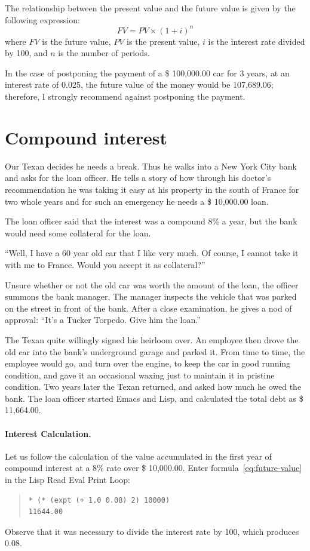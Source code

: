 \documentclass[a4paper,12pt]{book}
\begin{document}
The relationship between the present value
and the future value is given by the
following expression:
\begin{equation}
FV= PV\times (1+i)^n
\label{eq:future-value}
\end{equation}
where $FV$ is the future value, $PV$ is the present
value, $i$ is the interest rate divided by 100,
and $n$ is the number of periods.

In the case of postponing the payment of a \$ 100,000.00 car
for 3 years, at an interest rate of 0.025, the future
value of the money would be 107,689.06; therefore,
I strongly recommend against postponing the payment.

\section{Compound interest}

Our Texan decides he needs a break. Thus he walks into
a New York City bank and asks for the loan officer.
He tells a story of how through his doctor's recommendation
he was taking it easy at his property in the south of
France for two whole years and for such an 
emergency he needs a \$ 10,000.00 loan.

The loan officer said that the interest was a compound 8\%
a year, but the bank would need some collateral for the loan.

“Well, I have a 60 year old car that I like very much.
Of course, I cannot take it with me to France.
Would you accept it as collateral?”

Unsure whether or not the old car was worth the
amount of the loan, the officer summons the bank manager.
The manager inspects the vehicle that was parked on the
street in front of the bank. After a close examination,
he gives a nod of approval: “It’s a Tucker Torpedo.
Give him the loan.”

The Texan quite willingly signed his heirloom over.
An employee then drove the old car into the bank’s
underground garage and parked it. From time to time,
the employee would go, and turn over the engine, to keep
the car in good running condition, and gave it an
occasional waxing just to maintain it in pristine condition.
Two years later the Texan returned, and asked how
much he owed the bank. The loan officer started Emacs and
Lisp, and calculated the total debt as \$ 11,664.00.

\paragraph{Interest Calculation.}
Let us follow the calculation of the value accumulated
in the first year of compound interest at a 8\% rate
over \$ 10,000.00. Enter formula~\ref{eq:future-value} in
the Lisp Read Eval Print Loop:
\begin{quote}
\begin{verbatim}
* (* (expt (+ 1.0 0.08) 2) 10000)
11644.00
\end{verbatim}
\end{quote}
Observe that it was necessary to divide the
interest rate by 100, which produces 0.08.
\end{document}
